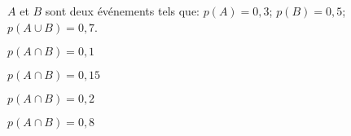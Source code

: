 \begin{QCM}
\begin{EnonceCommunQCM}
\end{EnonceCommunQCM}
\begin{GroupeQCM}
\begin{exercice}$A$ et $B$ sont deux événements tels que:
\hfill $p(A)=0,3$; \hfill $p(B)=0,5$; \hfill $p(A\cup B)=0,7$.\hfill
\begin{ChoixQCM}{4}
\item $p(A\cap B)=0,1$
\item $p(A\cap B)=0,15$
\item $p(A\cap B)=0,2$
\item $p(A\cap B)=0,8$
\end{ChoixQCM}
 \begin{corrige}
    \end{corrige}
\end{exercice}

\end{GroupeQCM}
\end{QCM}

